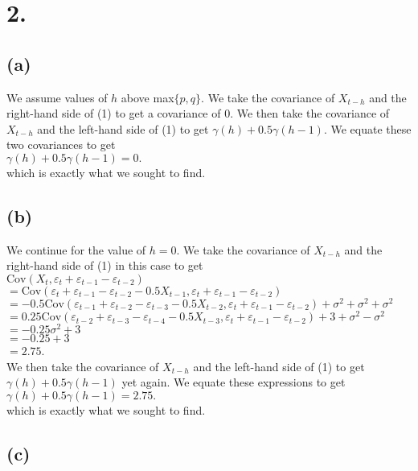 \documentclass{article}
\begin{document}
\section*{2.}
{\Large 
\subsection*{(a)}

We assume values of $h$ above max$\{p, q\}$. We take the covariance of $X_{t-h}$ and the right-hand side of (1) to get a covariance of 0. We then take the covariance of $X_{t-h}$ and the left-hand side of (1) to get $\gamma(h) + 0.5\gamma(h-1)$. We equate these two covariances to get \\
$\gamma(h) + 0.5\gamma(h-1) = 0.$ \\
which is exactly what we sought to find.

\subsection*{(b)}

We continue for the value of $h=0$. We take the covariance of $X_{t-h}$ and the right-hand side of (1) in this case to get \\ $\text{Cov}(X_t, \varepsilon_t + \varepsilon_{t-1} - \varepsilon_{t-2})$ \\ 
$= \text{Cov}(\varepsilon_t + \varepsilon_{t-1} - \varepsilon_{t-2} - 0.5X_{t-1}, \varepsilon_t + \varepsilon_{t-1} - \varepsilon_{t-2})$ \\ 
$= -0.5\text{Cov}(\varepsilon_{t-1} + \varepsilon_{t-2} - \varepsilon_{t-3} - 0.5X_{t-2}, \varepsilon_t + \varepsilon_{t-1} - \varepsilon_{t-2}) + \sigma^2 + \sigma^2 + \sigma^2$ \\ 
$= 0.25\text{Cov}(\varepsilon_{t-2} + \varepsilon_{t-3} - \varepsilon_{t-4} - 0.5X_{t-3}, \varepsilon_t + \varepsilon_{t-1} - \varepsilon_{t-2}) + 3 + \sigma^2 - \sigma^2$ \\ 
$= -0.25\sigma^2 + 3$ \\ 
$= -0.25 + 3$ \\
$= 2.75$. \\
We then take the covariance of $X_{t-h}$ and the left-hand side of (1) to get $\gamma(h) + 0.5\gamma(h-1)$ yet again. We equate these expressions to get \\
$\gamma(h) + 0.5\gamma(h-1) = 2.75.$ \\
which is exactly what we sought to find.

\subsection*{(c)}

}
\end{document}
